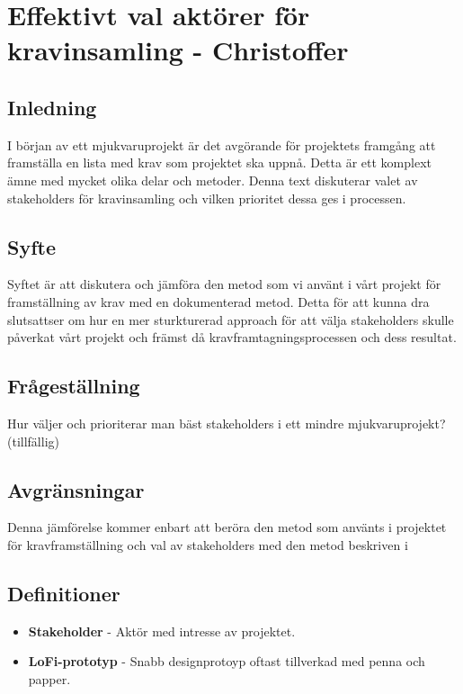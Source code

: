 \chapter{Effektivt val aktörer för \\kravinsamling - Christoffer}

\section{Inledning}
I början av ett mjukvaruprojekt är det avgörande för projektets framgång att framställa en lista med krav som projektet ska uppnå. Detta är ett komplext ämne med mycket olika delar och metoder. Denna text diskuterar valet av stakeholders för kravinsamling och vilken prioritet dessa ges i processen.

\section{Syfte}
Syftet är att diskutera och jämföra den metod som vi använt i vårt projekt för framställning av krav med en dokumenterad metod. Detta för att kunna dra slutsattser om hur en mer sturkturerad approach för att välja stakeholders skulle påverkat vårt projekt och främst då kravframtagningsprocessen och dess resultat.

\section{Frågeställning}
Hur väljer och prioriterar man bäst stakeholders i ett mindre mjukvaruprojekt? (tillfällig)

\section{Avgränsningar}
Denna jämförelse kommer enbart att beröra den metod som använts i projektet för kravframställning och val av stakeholders med den metod beskriven i  

\section{Definitioner}
\begin{itemize}
	\item \textbf{Stakeholder} - Aktör med intresse av projektet.
	\item \textbf{LoFi-prototyp} - Snabb designprotoyp oftast tillverkad med penna och papper.
\end{itemize}


